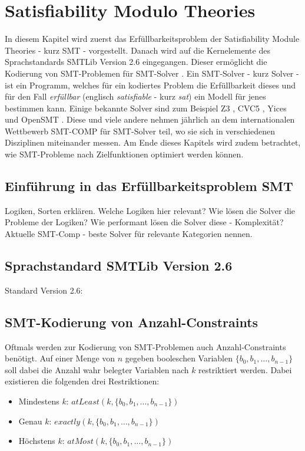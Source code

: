 \chapter{Satisfiability Modulo Theories}
\label{chapter:smt}

In diesem Kapitel wird zuerst das Erfüllbarkeitsproblem der Satisfiability Module Theories - kurz SMT - vorgestellt.
Danach wird auf die Kernelemente des Sprachstandards SMTLib Version 2.6 \cite{smtlib} eingegangen.
Dieser ermöglicht die Kodierung von SMT-Problemen für SMT-Solver \cite{smt}.
Ein SMT-Solver - kurz Solver - ist ein Programm, welches für ein kodiertes Problem die Erfüllbarkeit dieses und für den
Fall \textit{erfüllbar} (englisch \textit{satisfiable} - kurz \textit{sat}) ein Modell für jenes bestimmen kann.
Einige bekannte Solver sind zum Beispiel Z3 \cite{z3}, CVC5 \cite{cvc5}, Yices \cite{yices} und OpenSMT \cite{opensmt}.
Diese und viele andere nehmen jährlich an dem internationalen Wettbewerb SMT-COMP \cite{smtcomp} für SMT-Solver teil,
wo sie sich in verschiedenen Disziplinen miteinander messen.
Am Ende dieses Kapitels wird zudem betrachtet, wie SMT-Probleme nach Zielfunktionen optimiert werden können.

\section{Einführung in das Erfüllbarkeitsproblem SMT}
Logiken, Sorten erklären.
Welche Logiken hier relevant?
Wie lösen die Solver die Probleme der Logiken?
Wie performant lösen die Solver diese - Komplexität?
Aktuelle SMT-Comp - beste Solver für relevante Kategorien nennen.

\section{Sprachstandard SMTLib Version 2.6}
Standard Version 2.6: \cite{smtlib}

\section{SMT-Kodierung von Anzahl-Constraints}
\label{sec:smtcardinality}
Oftmals werden zur Kodierung von SMT-Problemen auch Anzahl-Constraints benötigt.
Auf einer Menge von $n$ gegeben booleschen Variablen $\{b_0, b_1, \ldots, b_{n-1}\}$ soll dabei die Anzahl wahr belegter Variablen nach $k$ restriktiert werden.
Dabei existieren die folgenden drei Restriktionen:
\begin{itemize}
    \item Mindestens $k$: $atLeast(k, \{b_0, b_1, \ldots, b_{n-1}\})$
    \item Genau $k$: $exactly(k, \{b_0, b_1, \ldots, b_{n-1}\})$
    \item Höchstens $k$: $atMost(k, \{b_0, b_1, \ldots, b_{n-1}\})$
\end{itemize}

